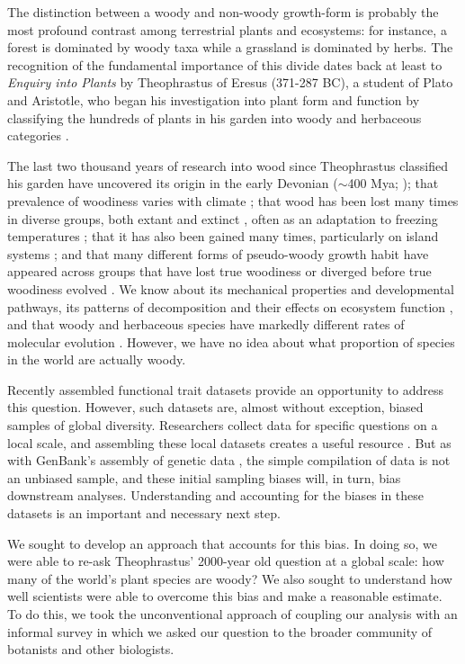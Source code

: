 The distinction between a woody and non-woody growth-form is
probably the most profound contrast among terrestrial plants and
ecosystems: for instance, a forest is dominated by woody taxa 
while a grassland is dominated by herbs.  The recognition of the fundamental
importance of this divide dates back at least to \textit{Enquiry into
  Plants} by Theophrastus of Eresus (371-287 BC), a student of
Plato and Aristotle, who began his investigation into plant form and
function by classifying the hundreds of plants in his garden into
woody and herbaceous categories \citep{theophrastus1916enquiry}.

The last two thousand years of research into wood since Theophrastus
classified his garden have uncovered its origin in the early Devonian
($\sim$400 Mya; \citealt{gerrienne2011simple}); that prevalence of
woodiness varies with climate \citep{Molesheihgt}; that wood has been
lost many times in diverse groups, both extant and extinct
\citep{judd1994}, often as an adaptation to freezing temperatures
\citep{Zanne}; that it has also been gained many times,
particularly on island systems \citep{Carlquist1974,Givnish1998};
and that many different forms of pseudo-woody growth
habit have appeared across groups that have lost true woodiness or
diverged before true woodiness evolved \citep{Cornwellwood}.  We know
about its mechanical properties and developmental pathways, its
patterns of decomposition and their effects on ecosystem function
\citep{Cornwellwood}, and that woody and herbaceous species have
markedly different rates of molecular evolution \citep{SmithDonoghue}.
%
However, we have no idea about what proportion of species in the world
are actually woody.

Recently assembled functional trait datasets provide an opportunity to
address this question. However, such datasets are, almost without
exception, biased samples of global diversity.  Researchers collect
data for specific questions on a local scale, and assembling these
local datasets creates a useful resource \citep{kattge2011try}.  But
as with GenBank's assembly of genetic data
\citep{smith2011understanding}, the simple compilation of data is not
an unbiased sample, and these initial sampling biases will, in turn,
bias downstream analyses.  Understanding and accounting for the biases
in these datasets is an important and necessary next step.

We sought to develop an approach that accounts for this bias.  In
doing so, we were able to re-ask Theophrastus' 2000-year old
question at a global scale: how many of the world's plant species are
woody?
%
We also sought to understand how well scientists were able to overcome
this bias and make a reasonable estimate.  To do this, we took the
unconventional approach of coupling our analysis with an informal
survey in which we asked our question to the broader community of
botanists and other biologists.

